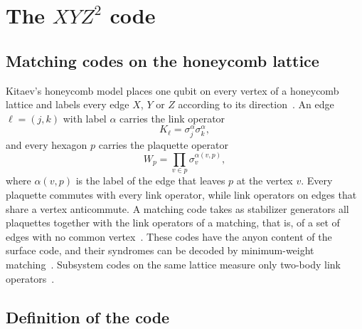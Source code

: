 \section{The $XYZ^2$ code}
\label{sec:code}

\subsection{Matching codes on the honeycomb lattice}

Kitaev's honeycomb model places one qubit on every vertex of a honeycomb lattice and labels every edge $X$, $Y$ or $Z$ according to its direction~\cite{kitaev2006}. An edge $\ell=(j,k)$ with label $\alpha$ carries the link operator
\begin{equation}
  K_\ell=\sigma^{\alpha}_{j}\sigma^{\alpha}_{k},
\end{equation}
and every hexagon $p$ carries the plaquette operator
\begin{equation}
  W_p=\prod_{v\in p}\sigma^{\alpha(v,p)}_{v},
  \label{eq:Wp}
\end{equation}
where $\alpha(v,p)$ is the label of the edge that leaves $p$ at the vertex $v$. Every plaquette commutes with every link operator, while link operators on edges that share a vertex anticommute. A matching code takes as stabilizer generators all plaquettes together with the link operators of a matching, that is, of a set of edges with no common vertex~\cite{wootton}. These codes have the anyon content of the surface code, and their syndromes can be decoded by minimum-weight matching~\cite{wootton,wootton2022}. Subsystem codes on the same lattice measure only two-body link operators~\cite{suchara2011,wootton2022}.

\subsection{Definition of the code}

